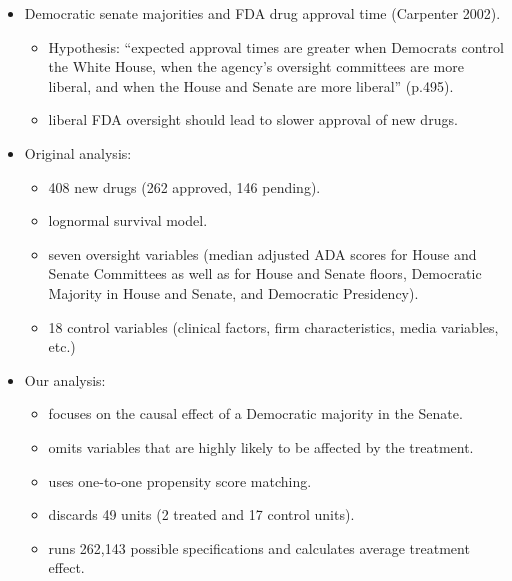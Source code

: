 \documentclass[20pt,landscape,pdftex]{foils}
\begin{document}
\begin{itemize}
\item Democratic senate majorities and FDA drug approval time
  (Carpenter 2002).\pause
  \begin{itemize}
  \item Hypothesis: ``expected approval times are greater when
    Democrats control the White House, when the agency's oversight
    committees are more liberal, and when the House and Senate are
    more liberal'' (p.495).\pause
  \item liberal FDA oversight should lead to slower approval of new
    drugs.\pause 
  \end{itemize}

\item Original analysis:\pause
  \begin{itemize}
  \item 408 new drugs (262 approved, 146 pending).\pause
  \item lognormal survival model.\pause
  \item seven oversight variables (median adjusted ADA scores for
    House and Senate Committees as well as for House and Senate
    floors, Democratic Majority in House and Senate, and Democratic
    Presidency).\pause
  \item 18 control variables (clinical factors, firm characteristics,
    media variables, etc.)\pause
  \end{itemize}

\item Our analysis:\pause
  \begin{itemize}
  \item focuses on the causal effect of a Democratic majority in the
    Senate.\pause
  \item omits variables that are highly likely to be affected by the
    treatment.\pause
  \item uses one-to-one propensity score matching.\pause
  \item discards 49 units (2 treated and 17 control units).\pause
  \item runs 262,143 possible specifications and calculates average
    treatment effect.\pause
  \end{itemize}
\end{itemize}


\end{document}
